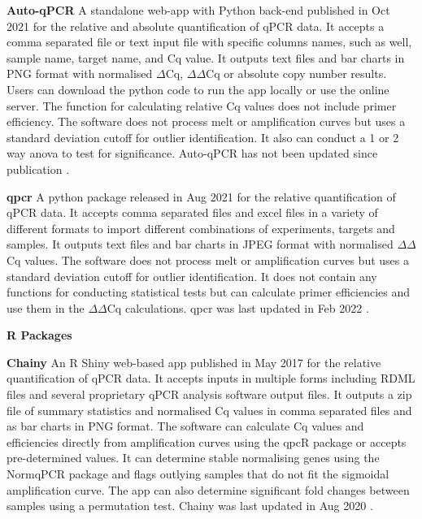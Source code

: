 \documentclass[../main.tex]{subfiles}
\begin{document}
\textbf{Auto-qPCR} A standalone web-app with Python back-end published in Oct 2021 for the relative and absolute quantification of qPCR data. 
It accepts a comma separated file or text input file with specific columns names, such as well, sample name, target name, and Cq value. 
It outputs text files and bar charts in PNG format with normalised $\Delta$Cq, $\Delta\Delta$Cq or absolute copy number results. 
Users can download the python code to run the app locally or use the online server. 
The function for calculating relative Cq values does not include primer efficiency. 
The software does not process melt or amplification curves but uses a standard deviation cutoff for outlier identification. 
It also can conduct a 1 or 2 way anova to test for significance. Auto-qPCR has not been updated since publication \parencite{Maussion2021}.

\textbf{qpcr}
A python package released in Aug 2021 for the relative quantification of qPCR data. 
It accepts comma separated files and excel files in a variety of different formats to import different combinations of experiments, targets and samples. 
It outputs text files and bar charts in JPEG format with normalised $\Delta\Delta$Cq values. The software does not process melt or amplification curves but uses a standard deviation cutoff for outlier identification. 
It does not contain any functions for conducting statistical tests but can calculate primer efficiencies and use them in the $\Delta\Delta$Cq calculations. 
qpcr was last updated in Feb 2022 \parencite{Kleinschmidt2022}.

\textbf{R Packages}

\textbf{Chainy} An R Shiny web-based app published in May 2017 for the relative quantification of qPCR data. 
It accepts inputs in multiple forms including RDML files and several proprietary qPCR analysis software output files. 
It outputs a zip file of summary statistics and normalised Cq values in comma separated files and as bar charts in PNG format. 
The software can calculate Cq values and efficiencies directly from amplification curves using the qpcR package or accepts pre-determined values. 
It can determine stable normalising genes using the NormqPCR package and flags outlying samples that do not fit the sigmoidal amplification curve. 
The app can also determine significant fold changes between samples using a permutation test. 
Chainy was last updated in Aug 2020 \parencite{Mallona2017}.
\end{document}
